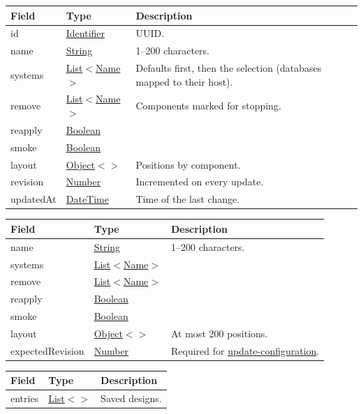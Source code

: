 \documentclass[a4paper]{arrowhead}
\newcommand{\mref}[2][]{{\textcolor{ArrowheadPurple}{\hyperref[sec:model:#2]{\ifstrempty{#1}{#2}{#1}}}}}
\newcommand{\oref}[1]{{\textcolor{ArrowheadBlue}{\hyperref[sec:operations:#1]{#1}}}}
\newcommand{\pref}[1]{{\textcolor{ArrowheadGrey}{\hyperref[sec:model:primitives:#1]{#1}}}}
\begin{document}
\noindent\begin{tabularx}{\textwidth}{| >{\raggedright\arraybackslash}p{3.6cm} | >{\raggedright\arraybackslash\small}p{4.4cm} | X |} \hline
\rowcolor{gray!33} Field & Type & Description \\ \hline
id & \pref{Identifier} & UUID. \\ \hline
name & \pref{String} & 1--200 characters. \\ \hline
systems & \pref{List}$<$\pref{Name}$>$ & Defaults first, then the selection (databases mapped to their host). \\ \hline
remove & \pref{List}$<$\pref{Name}$>$ & Components marked for stopping. \\ \hline
reapply & \pref{Boolean} &  \\ \hline
smoke & \pref{Boolean} &  \\ \hline
layout & \pref{Object}$<$\mref{Point}$>$ & Positions by component. \\ \hline
revision & \pref{Number} & Incremented on every update. \\ \hline
updatedAt & \pref{DateTime} & Time of the last change. \\ \hline
\end{tabularx}


\noindent\begin{tabularx}{\textwidth}{| >{\raggedright\arraybackslash}p{3.6cm} | >{\raggedright\arraybackslash\small}p{4.4cm} | X |} \hline
\rowcolor{gray!33} Field & Type & Description \\ \hline
name & \pref{String} & 1--200 characters. \\ \hline
systems & \pref{List}$<$\pref{Name}$>$ &  \\ \hline
remove & \pref{List}$<$\pref{Name}$>$ &  \\ \hline
reapply & \pref{Boolean} &  \\ \hline
smoke & \pref{Boolean} &  \\ \hline
layout & \pref{Object}$<$\mref{Point}$>$ & At most 200 positions. \\ \hline
expectedRevision & \pref{Number} & Required for \oref{update-configuration}. \\ \hline
\end{tabularx}


\noindent\begin{tabularx}{\textwidth}{| >{\raggedright\arraybackslash}p{3.6cm} | >{\raggedright\arraybackslash\small}p{4.4cm} | X |} \hline
\rowcolor{gray!33} Field & Type & Description \\ \hline
entries & \pref{List}$<$\mref{Configuration}$>$ & Saved designs. \\ \hline
\end{tabularx}
\end{document}
